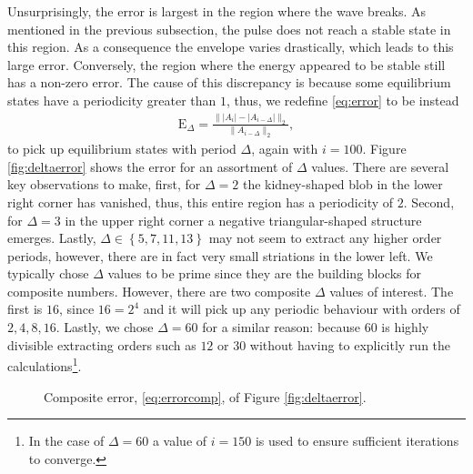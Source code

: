 Unsurprisingly, the error is largest in the region where the wave breaks. As mentioned in the previous subsection, the pulse does not reach a stable state in this region. As a consequence the envelope varies drastically, which leads to this large error. Conversely, the region where the energy appeared to be stable still has a non-zero error. The cause of this discrepancy is because some equilibrium states have a periodicity greater than $1$, thus, we redefine \eqref{eq:error} to be instead
\begin{align}
\textrm{E}_\Delta = \frac{\| |A_i| - |A_{i-\Delta}| \|_2}{\| A_{i-\Delta} \|_2},
\label{eq:deltaerror}
\end{align}
to pick up equilibrium states with period $\Delta$, again with $i = 100$. Figure \ref{fig:deltaerror} shows the error for an assortment of $\Delta$ values. There are several key observations to make, first, for $\Delta = 2$ the kidney-shaped blob in the lower right corner has vanished, thus, this entire region has a periodicity of $2$. Second, for $\Delta = 3$ in the upper right corner a negative triangular-shaped structure emerges. Lastly, $\Delta \in \left\{ 5, 7, 11, 13 \right\}$ may not seem to extract any higher order periods, however, there are in fact very small striations in the lower left. We typically chose $\Delta$ values to be prime since they are the building blocks for composite numbers. However, there are two composite $\Delta$ values of interest. The first is $16$, since $16 = 2^4$ and it will pick up any periodic behaviour with orders of $2, 4, 8, 16$. Lastly, we chose $\Delta = 60$ for a similar reason: because $60$ is highly divisible extracting orders such as $12$ or $30$ without having to explicitly run the calculations\footnote{In the case of $\Delta = 60$ a value of $i = 150$ is used to ensure sufficient iterations to converge.}. \\

\begin{figure}[tbp]

\caption[Composite error.]{Composite error, \eqref{eq:errorcomp}, of Figure \ref{fig:deltaerror}.}
\label{fig:errorcomp}
\end{figure}

